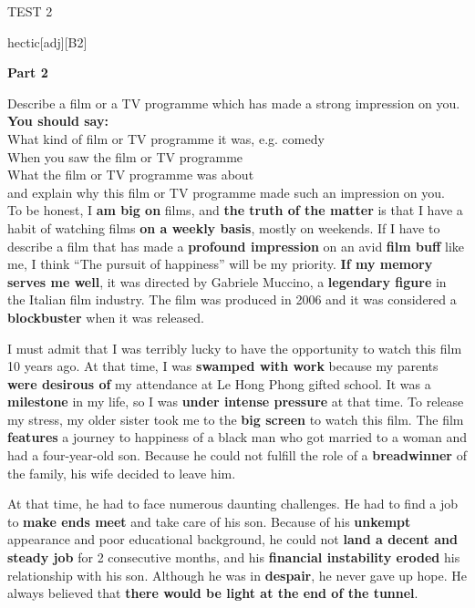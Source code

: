 \documentclass[a4paper,12pt]{article}
\begin{document}
\begin{glossarymc}[Cambridge 3]
\begin{test}{TEST 2}
\begin{VocabExplain}[Part 1]
\begin{ExplainCard}{hectic}[adj][B2]
\end{ExplainCard}

\end{VocabExplain}
\noindent
\textbf{Part 2}

\begin{qa}{Describe a film or a TV programme which has made a strong impression on you.}
\textbf{You should say:}\\
What kind of film or TV programme it was, e.g. comedy\\
When you saw the film or TV programme  \\
What the film or TV programme was about  \\
and explain why this film or TV programme made such an impression on you.  \\

To be honest, I \textbf{am big on} films, and \textbf{the truth of the matter} is that I have a habit of watching films \textbf{on a weekly basis}, mostly on weekends. If I have to describe a film that has made a \textbf{profound impression} on an avid \textbf{film buff} like me, I think ``The pursuit of happiness'' will be my priority. \textbf{If my memory serves me well}, it was directed by Gabriele Muccino, a \textbf{legendary figure} in the Italian film industry. The film was produced in 2006 and it was considered a \textbf{blockbuster} when it was released.  

I must admit that I was terribly lucky to have the opportunity to watch this film 10 years ago. At that time, I was \textbf{swamped with work} because my parents \textbf{were desirous of} my attendance at Le Hong Phong gifted school. It was a \textbf{milestone} in my life, so I was \textbf{under intense pressure} at that time. To release my stress, my older sister took me to the \textbf{big screen} to watch this film. The film \textbf{features} a journey to happiness of a black man who got married to a woman and had a four-year-old son. Because he could not fulfill the role of a \textbf{breadwinner} of the family, his wife decided to leave him.  

At that time, he had to face numerous daunting challenges. He had to find a job to \textbf{make ends meet} and take care of his son. Because of his \textbf{unkempt} appearance and poor educational background, he could not \textbf{land a decent and steady job} for 2 consecutive months, and his \textbf{financial instability eroded} his relationship with his son. Although he was in \textbf{despair}, he never gave up hope. He always believed that \textbf{there would be light at the end of the tunnel}.  


\end{qa}
\end{test}
\end{glossarymc}
\end{document}
